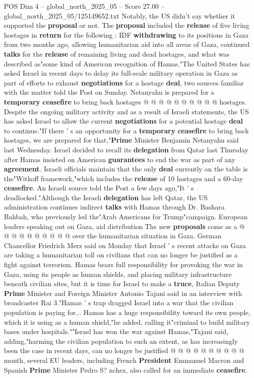 \begin{textsample}{POS Dim 4 – global\_north\_2025\_05 – Score 27.00 – global\_north\_2025\_05/125149652.txt}
Notably, the US didn't say whether it supported the \textbf{proposal} or not.
The \textbf{proposal} included the \textbf{release} of five living hostages in \textbf{return} for the following : IDF \textbf{withdrawing} to its positions in Gaza from two months ago, allowing humanitarian aid into all areas of Gaza, continued \textbf{talks} for the \textbf{release} of remaining living and dead hostages, and what was described as"some kind of American recognition of Hamas."The United States has asked Israel in recent days to delay its full-scale military operation in Gaza as part of efforts to exhaust \textbf{negotiations} for a hostage \textbf{deal}, two sources familiar with the matter told the Post on Sunday.
Netanyahu is prepared for a \textbf{temporary} \textbf{ceasefire} to bring back hostages @ @ @ @ @ @ @ @ @ @ hostages.
Despite the ongoing military activity and as a result of Israeli statements, the US has asked Israel to allow the current \textbf{negotiations} for a potential hostage \textbf{deal} to continue."If there ' s an opportunity for a \textbf{temporary} \textbf{ceasefire} to bring back hostages, we are prepared for that,"\textbf{Prime} Minister Benjamin Netanyahu said last Wednesday.
Israel decided to recall its \textbf{delegation} from Qatar last Thursday after Hamas insisted on American \textbf{guarantees} to end the war as part of any \textbf{agreement}.
Israeli officials maintain that the only \textbf{deal} currently on the table is the"Witkoff framework,"which includes the \textbf{release} of 10 hostages and a 60-day \textbf{ceasefire}.
An Israeli source told the Post a few days ago,"It ' s deadlocked."Although the Israeli \textbf{delegation} has left Qatar, the US administration continues indirect \textbf{talks} with Hamas through Dr.
Bashara Bahbah, who previously led the"Arab Americans for Trump"campaign.
European leaders speaking out on Gaza, aid distribution The new \textbf{proposals} come as a @ @ @ @ @ @ @ @ @ @ over the humanitarian situation in Gaza.
German Chancellor Friedrich Merz said on Monday that Israel ' s recent attacks on Gaza are taking a humanitarian toll on civilians that can no longer be justified as a fight against terrorism.
Hamas bears full responsibility for provoking the war in Gaza, using its people as human shields, and placing military infrastructure beneath civilian sites, but it is time for Israel to make a \textbf{truce}, Italian Deputy \textbf{Prime} Minister and Foreign Minister Antonio Tajani said in an interview with broadcaster Rai 3."Hamas ' s trap dragged Israel into a war that the civilian population is paying for...
Hamas has a huge responsibility toward its own people, which it is using as a human shield,"he added, calling it"criminal to build military bases under hospitals.""Israel has won the war against Hamas,"Tajani said, adding,"harming the civilian population to such an extent, as has increasingly been the case in recent days, can no longer be justified @ @ @ @ @ @ @ @ @ @ month, several EU leaders, including French \textbf{President} Emmanuel Macron and Spanish \textbf{Prime} Minister Pedro S? nchez, also called for an immediate \textbf{ceasefire}.


\end{textsample}

